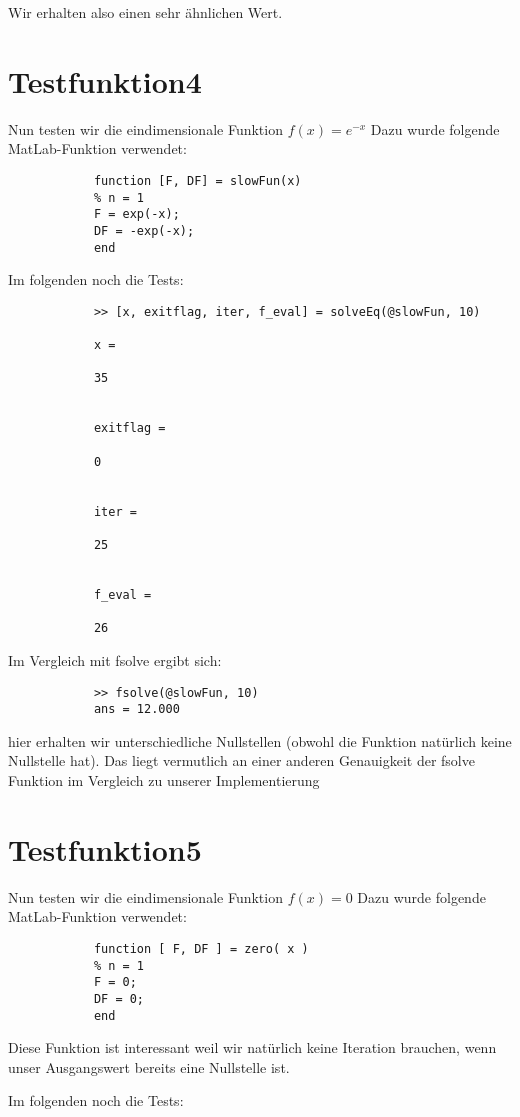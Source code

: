 \documentclass[11pt,titlepage]{article}
\begin{document}
		Wir erhalten also einen sehr ähnlichen Wert.
	
	\section{Testfunktion4}
		Nun testen wir die eindimensionale Funktion $ f(x) = e^{-x}$
		Dazu wurde folgende MatLab-Funktion verwendet:
		\begin{lstlisting}
			function [F, DF] = slowFun(x)
			% n = 1  
			F = exp(-x);
			DF = -exp(-x);
			end
		\end{lstlisting}
	
		Im folgenden noch die Tests:
		
		\begin{lstlisting}
			>> [x, exitflag, iter, f_eval] = solveEq(@slowFun, 10)
			
			x =
			
			35
			
			
			exitflag =
			
			0
			
			
			iter =
			
			25
			
			
			f_eval =
			
			26
		\end{lstlisting}
		
		Im Vergleich mit fsolve ergibt sich:
		
		\begin{lstlisting}
			>> fsolve(@slowFun, 10)
			ans = 12.000
		\end{lstlisting}
	
		hier erhalten wir unterschiedliche Nullstellen (obwohl die Funktion natürlich keine Nullstelle hat). Das liegt vermutlich an einer anderen Genauigkeit der fsolve Funktion im Vergleich zu unserer Implementierung
		
	\section{Testfunktion5}
		Nun testen wir die eindimensionale Funktion $ f(x) = 0$
		Dazu wurde folgende MatLab-Funktion verwendet:
		\begin{lstlisting}
			function [ F, DF ] = zero( x )
			% n = 1
			F = 0;
			DF = 0;
			end
		\end{lstlisting}
		Diese Funktion ist interessant weil wir natürlich keine Iteration brauchen, wenn unser Ausgangswert bereits eine Nullstelle ist.
	
		Im folgenden noch die Tests:
		
\end{document}
